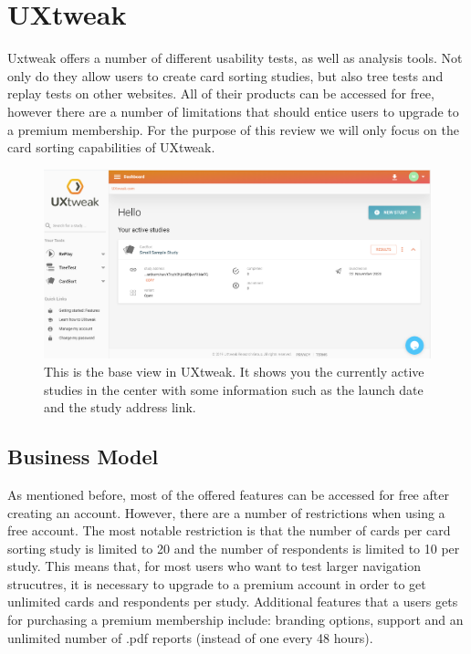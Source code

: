 \chapter{UXtweak}

\label{chap:UXtweak}


Uxtweak offers a number of different usability tests, as well as analysis tools.
 Not only do they allow users to create card sorting studies, but also tree 
 tests and replay tests on other websites. All of their products can be 
accessed for free, however there are a number of limitations that should entice
 users to upgrade to a premium membership. For the purpose of this review
we will only focus on the card sorting capabilities of UXtweak.

\begin{figure}[tp] 
\centering
\includegraphics[keepaspectratio,width=\linewidth,height=\halfh]{images/uxtweak-dashboard.png}
\caption[UXtweak Application] { This is the base view in UXtweak.
It shows you the currently active studies in the center with some information 
such as the launch date and the study address link.
 }
\label{fig:UXtweak1}
\end{figure}

\section{Business Model}
As mentioned before, most of the offered features can be accessed for free after
 creating an account. However, there are  a number of restrictions when using a
free account. The most notable restriction is that the number of cards per card
sorting study is limited to 20 and the number of respondents is limited to 10 per
study. This means that, for most users who want to test larger navigation
strucutres, it is necessary to upgrade to a premium account in order to get 
unlimited cards and respondents per study. Additional features that a users gets
for purchasing a premium membership include: branding options, support and an
unlimited number of .pdf reports (instead of one every 48 hours).


